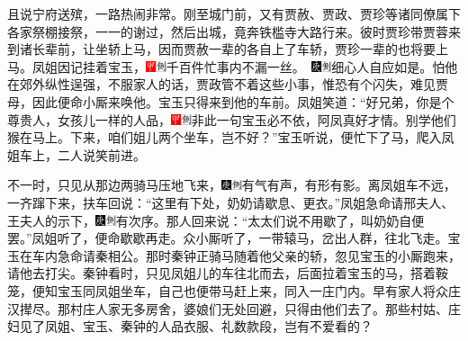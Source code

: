 且说宁府送殡，一路热闹非常。刚至城门前，又有贾赦、贾政、贾珍等诸同僚属下各家祭棚接祭，一一的谢过，然后出城，竟奔铁槛寺大路行来。彼时贾珍带贾蓉来到诸长辈前，让坐轿上马，因而贾赦一辈的各自上了车轿，贾珍一辈的也将要上马。凤姐因记挂着宝玉，{\includegraphics[width=3mm]{../Images/00002}\includegraphics[width=3mm]{../Images/00011}\footnotesize \kaishu 千百件忙事内不漏一丝。　\includegraphics[width=3mm]{../Images/00004}\includegraphics[width=3mm]{../Images/00011}\footnotesize \kaishu 细心人自应如是。}怕他在郊外纵性逞强，不服家人的话，贾政管不着这些小事，惟恐有个闪失，难见贾母，因此便命小厮来唤他。宝玉只得来到他的车前。凤姐笑道：``好兄弟，你是个尊贵人，女孩儿一样的人品，{\includegraphics[width=3mm]{../Images/00002}\includegraphics[width=3mm]{../Images/00011}\footnotesize \kaishu 非此一句宝玉必不依，阿凤真好才情。}别学他们猴在马上。下来，咱们姐儿两个坐车，岂不好？''宝玉听说，便忙下了马，爬入凤姐车上，二人说笑前进。

不一时，只见从那边两骑马压地飞来，{\includegraphics[width=3mm]{../Images/00004}\includegraphics[width=3mm]{../Images/00011}\footnotesize \kaishu 有气有声，有形有影。}离凤姐车不远，一齐蹿下来，扶车回说：``这里有下处，奶奶请歇息、更衣。''凤姐急命请邢夫人、王夫人的示下，{\includegraphics[width=3mm]{../Images/00004}\includegraphics[width=3mm]{../Images/00011}\footnotesize \kaishu 有次序。}那人回来说：``太太们说不用歇了，叫奶奶自便罢。''凤姐听了，便命歇歇再走。众小厮听了，一带辕马，岔出人群，往北飞走。宝玉在车内急命请秦相公。那时秦钟正骑马随着他父亲的轿，忽见宝玉的小厮跑来，请他去打尖。秦钟看时，只见凤姐儿的车往北而去，后面拉着宝玉的马，搭着鞍笼，便知宝玉同凤姐坐车，自己也便带马赶上来，同入一庄门内。早有家人将众庄汉撵尽。那村庄人家无多房舍，婆娘们无处回避，只得由他们去了。那些村姑、庄妇见了凤姐、宝玉、秦钟的人品衣服、礼数款段，岂有不爱看的？

